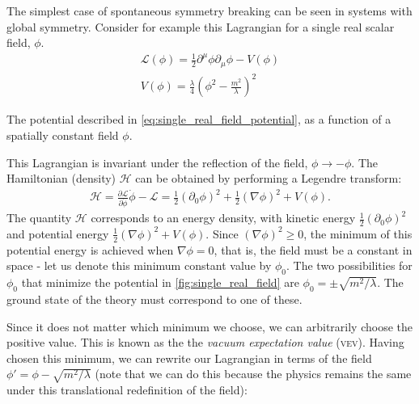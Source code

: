 The simplest case of spontaneous symmetry breaking can be seen in systems with global symmetry. Consider for example this Lagrangian for a single real scalar field, $\phi$.
\begin{align}
\mathcal{L}(\phi) = \frac{1}{2}\partial^\mu\phi\partial_\mu\phi - V(\phi)\\
V(\phi) = \frac{\lambda}{4}\left(\phi^2 - \frac{m^2}{\lambda}\right)^2
\label{eq:single_real_field_potential}
\end{align}

\begin{marginfigure}
\caption{The potential described in \autoref{eq:single_real_field_potential}, as a function of a spatially constant field $\phi$.}
\label{fig:single_real_field}
\end{marginfigure}
This Lagrangian is invariant under the reflection of the field, $\phi\rightarrow -\phi$. The Hamiltonian (density) $\mathcal{H}$ can be obtained by performing a Legendre transform:
\begin{align}
\mathcal{H} = \frac{\partial\mathcal{L}}{\partial\dot{\phi}}\dot{\phi} - \mathcal{L} = \frac{1}{2}(\partial_0\phi)^2+ \frac{1}{2}(\nabla\phi)^2+ V(\phi).
\end{align}
The quantity $\mathcal{H}$ corresponds to an energy density, with kinetic energy $\frac{1}{2}(\partial_0\phi)^2$ and potential energy $\frac{1}{2}(\nabla\phi)^2 + V(\phi)$. Since $(\nabla\phi)^2 \geq 0$, the minimum of this potential energy is achieved when $\nabla\phi = 0$, that is, the field must be a constant in space - let us denote this minimum constant value by $\phi_0$. The two possibilities for $\phi_0$ that minimize the potential in \autoref{fig:single_real_field} are $\phi_0 = \pm\sqrt{m^2/\lambda}$. The ground state of the theory must correspond to one of these.

Since it does not matter which minimum we choose, we can arbitrarily choose the positive value. This is known as the the \emph{vacuum expectation value} (\textsc{vev}). Having chosen this minimum, we can rewrite our Lagrangian in terms of the field $\phi' = \phi - \sqrt{m^2/\lambda}$ (note that we can do this because the physics remains the same under this translational redefinition of the field):

